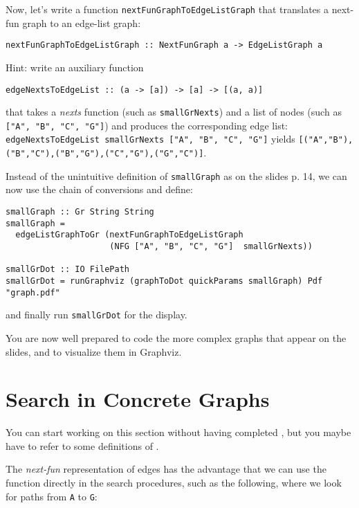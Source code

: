 \documentclass[english]{article}
\begin{document}
\begin{exo}\label{exo:nextFunGraphToEdgeListGraph}
Now, let's 
write a function \texttt{nextFunGraphToEdgeListGraph} that translates a
next-fun graph to an edge-list graph:
\begin{lstlisting}
nextFunGraphToEdgeListGraph :: NextFunGraph a -> EdgeListGraph a
\end{lstlisting}

Hint: write an auxiliary function
\begin{lstlisting}
edgeNextsToEdgeList :: (a -> [a]) -> [a] -> [(a, a)]
\end{lstlisting}
that takes a \emph{nexts} function (such as \texttt{smallGrNexts}) and a list
of nodes (such as \texttt{["A", "B", "C", "G"]}) and produces the
corresponding edge list: \texttt{edgeNextsToEdgeList smallGrNexts ["A", "B", "C", "G"]} yields 
\texttt{[("A","B"),("B","C"),("B","G"),("C","G"),("G","C")]}.
\end{exo}

Instead of the unintuitive definition of \texttt{smallGraph} as on the slides
p. 14, we can now use the chain of conversions and define:
\begin{lstlisting}
smallGraph :: Gr String String
smallGraph =
  edgeListGraphToGr (nextFunGraphToEdgeListGraph
                     (NFG ["A", "B", "C", "G"]  smallGrNexts))

smallGrDot :: IO FilePath
smallGrDot = runGraphviz (graphToDot quickParams smallGraph) Pdf "graph.pdf"         
\end{lstlisting}
and finally run \texttt{smallGrDot} for the display.

You are now well prepared to code the more complex graphs that appear on the
slides, and to visualize them in Graphviz.

\section{Search in Concrete Graphs}\label{sec:search_concrete}

You can start working on this section without having completed
, but you maybe have to refer to some definitions of
.

The \emph{next-fun} representation of edges has the advantage that we can use
the function directly in the search procedures, such as the following, where
we look for paths from \texttt{A} to \texttt{G}:
\end{document}
